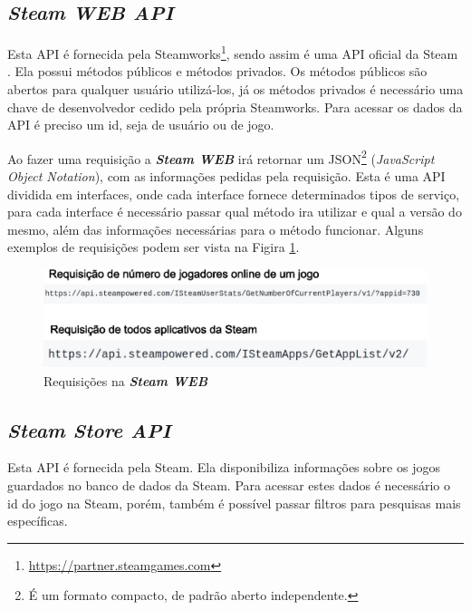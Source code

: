 \subsection*{\textit{Steam WEB API}}
Esta API é fornecida pela Steamworks\footnote[4]{\url{https://partner.steamgames.com}}, sendo assim é uma API oficial da Steam \cite{steam_api}. Ela possui métodos públicos e métodos privados. Os métodos públicos são abertos para qualquer usuário utilizá-los, já os métodos privados é necessário uma chave de desenvolvedor cedido pela própria Steamworks. Para acessar os dados da API é preciso um id, seja de usuário ou de jogo.

Ao fazer uma requisição a \textit{\textbf{Steam WEB}} irá retornar um JSON\footnote[5]{É um formato compacto, de padrão aberto independente.} (\textit{JavaScript Object Notation}), com as informações pedidas pela requisição. Esta é uma API dividida em interfaces, onde cada interface fornece determinados tipos de serviço, para cada interface é necessário passar qual método ira utilizar e qual a versão do mesmo, além das informações necessárias para o método funcionar. Alguns exemplos de requisições podem ser vista na Figira \ref{image:requiWeb}.
\begin{figure} [H]
\centering
\includegraphics[scale=0.5]{figuras/requisicaoWeb.eps}
\caption{Requisições na \textit{\textbf{Steam WEB}}}
\label{image:requiWeb}
\end{figure}

\subsection*{\textit{Steam Store API}}
Esta API é fornecida pela Steam. Ela disponibiliza informações sobre os jogos guardados no banco de dados da Steam. Para acessar estes dados é necessário o id do jogo na Steam, porém, também é possível passar filtros para pesquisas mais específicas.


